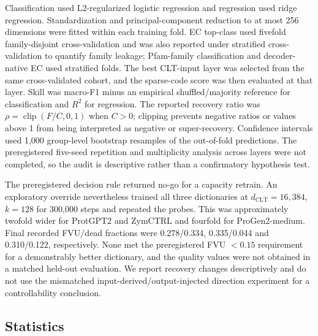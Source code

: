 \documentclass[pdflatex,sn-nature]{sn-jnl}
\begin{document}
Classification used L2-regularized logistic regression and regression used ridge regression. Standardization and principal-component reduction to at most 256 dimensions were fitted within each training fold. EC top-class used fivefold family-disjoint cross-validation and was also reported under stratified cross-validation to quantify family leakage; Pfam-family classification and decoder-native EC used stratified folds. The best CLT-input layer was selected from the same cross-validated cohort, and the sparse-code score was then evaluated at that layer. Skill was macro-F1 minus an empirical shuffled/majority reference for classification and $R^2$ for regression. The reported recovery ratio was $\rho=\operatorname{clip}(F/C,0,1)$ when $C>0$; clipping prevents negative ratios or values above 1 from being interpreted as negative or super-recovery. Confidence intervals used 1,000 group-level bootstrap resamples of the out-of-fold predictions. The preregistered five-seed repetition and multiplicity analysis across layers were not completed, so the audit is descriptive rather than a confirmatory hypothesis test.

The preregistered decision rule returned no-go for a capacity retrain. An exploratory override nevertheless trained all three dictionaries at $d_\mathrm{CLT}=16{,}384$, $k=128$ for 300,000 steps and repeated the probes. This was approximately twofold wider for ProtGPT2 and ZymCTRL and fourfold for ProGen2-medium. Final recorded FVU/dead fractions were 0.278/0.334, 0.335/0.044 and 0.310/0.122, respectively. None met the preregistered FVU $<0.15$ requirement for a demonstrably better dictionary, and the quality values were not obtained in a matched held-out evaluation. We report recovery changes descriptively and do not use the mismatched input-derived/output-injected direction experiment for a controllability conclusion.

\subsection{Statistics}
\end{document}
